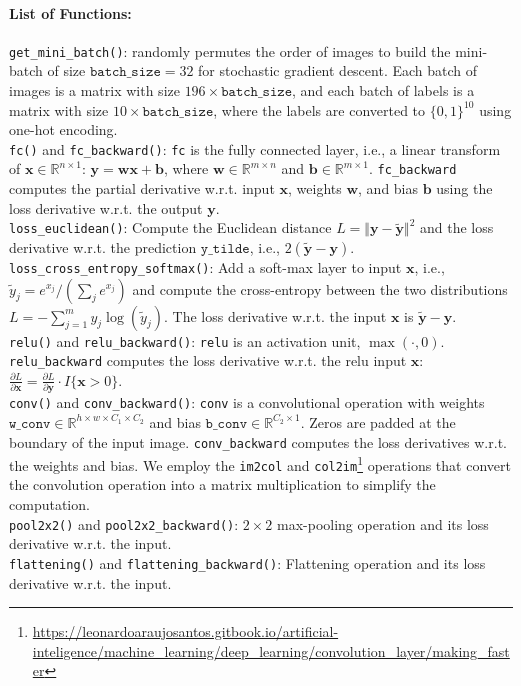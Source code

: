 \documentclass[11pt]{scrartcl}
\begin{document}
\paragraph{\textbf{List of Functions: }}
\texttt{get\_mini\_batch()}: randomly permutes the order of images to build the mini-batch of size $\texttt{batch\_size}=32$ for stochastic gradient descent. Each batch of images is a matrix with size $196\times\texttt{batch\_size}$, and each batch of labels is a matrix with size $10\times\texttt{batch\_size}$, where the labels are converted to $\{0,1\}^{10}$ using one-hot encoding.
\\
\indent\texttt{fc()} and \texttt{fc\_backward()}: \texttt{fc} is the fully connected layer, i.e., a linear transform of $\mathbf{x}\in\mathbb{R}^{n\times1}$: $\mathbf{y}=\mathbf{w}\mathbf{x}+\mathbf{b}$, where $\mathbf{w}\in\mathbb{R}^{m\times n}$ and $\mathbf{b}\in\mathbb{R}^{m\times 1}$. \texttt{fc\_backward} computes the partial derivative w.r.t. input $\mathbf{x}$, weights $\mathbf{w}$, and bias $\mathbf{b}$ using the loss derivative w.r.t. the output $\mathbf{y}$. 
	\\
\indent\texttt{loss\_euclidean()}: Compute the Euclidean distance $L=\Vert\mathbf{y}-\tilde{\mathbf{y}}\Vert^2$  and the loss derivative w.r.t. the prediction $\texttt{y\_tilde}$, i.e., $2(\tilde{\mathbf{y}}-\mathbf{y})$.
\\
\indent\texttt{loss\_cross\_entropy\_softmax()}: Add a soft-max layer to input $\mathbf{x}$, i.e., $\tilde{y}_j={e^{x_j}}/{(\sum_{j}e^{x_j})}$ and compute the cross-entropy between the two distributions $L=-\sum_{j=1}^{m}y_j\log\left(\tilde{y}_j\right)$. The loss derivative w.r.t. the input $\mathbf{x}$ is $\tilde{\mathbf{y}}-\mathbf{y}$.
\\
\indent \texttt{relu()} and \texttt{relu\_backward()}: \texttt{relu} is an activation unit, $\max(\cdot,0)$. \texttt{relu\_backward} computes the loss derivative w.r.t. the relu input $\mathbf{x}$: $\frac{\partial L}{\partial\mathbf{x}}=\frac{\partial L}{\partial\mathbf{y}}\cdot I\{\mathbf{x}>0\}$.
\\
\indent\texttt{conv()} and \texttt{conv\_backward()}: \texttt{conv} is a convolutional operation with weights $\texttt{w\_conv}\in\mathbb{R}^{h\times w\times C_1\times C_2}$ and bias $\texttt{b\_conv}\in\mathbb{R}^{C_2\times 1}$. Zeros are padded at the boundary of the input image. \texttt{conv\_backward} computes the loss derivatives w.r.t. the weights and bias. We employ the \texttt{im2col} and \texttt{col2im}\footnote{\url{https://leonardoaraujosantos.gitbook.io/artificial-inteligence/machine_learning/deep_learning/convolution_layer/making_faster}}  operations that convert the convolution operation into a matrix multiplication to simplify the computation.
\\
\indent\texttt{pool2x2()} and \texttt{pool2x2\_backward()}: $2\times 2$ max-pooling operation and its loss derivative w.r.t. the input.
\\
\indent\texttt{flattening()} and \texttt{flattening\_backward()}: Flattening operation and its loss derivative w.r.t. the input.
\end{document}
